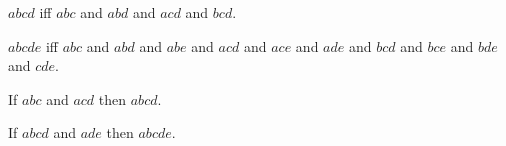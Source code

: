 \documentclass[10pt,a4paper,parskip=half,numbers=endperiod,headings=standardclasses,parskip]{scrbook}
\newcommand{\Betw}[3]{#1 #2 #3}
\newcommand{\BetwFour}[4]{#1 #2 #3 #4}
\newcommand{\BetwFive}[5]{#1 #2 #3 #4 #5}
\newcommand{\BetwSix}[6]{#1 #2 #3 #4 #5 #6}
\begin{document}


  \begin{forthel}
    \begin{definition}
      $\BetwFour{a}{b}{c}{d}$ iff
      $\Betw{a}{b}{c}$ and
      $\Betw{a}{b}{d}$ and
      $\Betw{a}{c}{d}$ and
      $\Betw{b}{c}{d}$.
    \end{definition}

    \begin{definition}
      $\BetwFive{a}{b}{c}{d}{e}$ iff
      $\Betw{a}{b}{c}$ and
      $\Betw{a}{b}{d}$ and
      $\Betw{a}{b}{e}$ and
      $\Betw{a}{c}{d}$ and
      $\Betw{a}{c}{e}$ and
      $\Betw{a}{d}{e}$ and
      $\Betw{b}{c}{d}$ and
      $\Betw{b}{c}{e}$ and
      $\Betw{b}{d}{e}$ and
      $\Betw{c}{d}{e}$.
    \end{definition}

    \begin{lemma}[BetwThreeToFour] %
      If $\Betw{a}{b}{c}$ and $\Betw{a}{c}{d}$
      then $\BetwFour{a}{b}{c}{d}$.
    \end{lemma}

    \begin{lemma}[BetwFourToFive] %
      If $\BetwFour{a}{b}{c}{d}$ and $\Betw{a}{d}{e}$
      then $\BetwFive{a}{b}{c}{d}{e}$.
    \end{lemma}
  \end{forthel}


\end{document}

